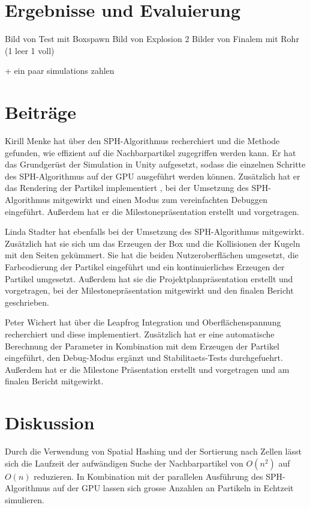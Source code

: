\documentclass[a4paper]{paper}
\begin{document}
\section{Ergebnisse und Evaluierung}
Bild von Test mit Boxspawn
Bild von Explosion
2 Bilder von Finalem mit Rohr (1 leer 1 voll)

+ ein paar simulations zahlen

\section{Beiträge}
Kirill Menke hat über den SPH-Algorithmus recherchiert und die Methode gefunden, wie 
effizient auf die Nachbarpartikel zugegriffen werden kann. Er hat das Grundgerüst der Simulation in Unity aufgesetzt, sodass die einzelnen Schritte des SPH-Algorithmus auf der GPU ausgeführt werden können. Zusätzlich hat er das Rendering der Partikel implementiert , bei der Umsetzung des SPH-Algorithmus mitgewirkt und einen Modus zum vereinfachten Debuggen eingeführt. Außerdem hat er die Milestonepräsentation erstellt und vorgetragen. 

Linda Stadter hat ebenfalls bei der Umsetzung des SPH-Algorithmus mitgewirkt. Zusätzlich hat sie sich um das Erzeugen der Box und die Kollisionen der Kugeln mit den Seiten gekümmert. Sie hat die beiden Nutzeroberflächen umgesetzt, die Farbcodierung der Partikel eingeführt und ein kontinuierliches Erzeugen der Partikel umgesetzt. Außerdem hat sie die Projektplanpräsentation erstellt und vorgetragen, bei der Milestonepräsentation mitgewirkt und den finalen Bericht geschrieben.

Peter Wichert hat über die Leapfrog Integration und Oberflächenspannung recherchiert und diese implementiert. Zusätzlich hat er eine automatische Berechnung der Parameter in Kombination mit dem Erzeugen der Partikel eingeführt, den Debug-Modus ergänzt und Stabilitaets-Tests durchgefuehrt. Außerdem hat er die Milestone Präsentation erstellt und vorgetragen und am finalen Bericht mitgewirkt.



\section{Diskussion}
Durch die Verwendung von Spatial Hashing und der Sortierung nach Zellen lässt sich die Laufzeit der aufwändigen Suche der Nachbarpartikel von $O(n^2)$ auf $O(n)$ reduzieren.
In Kombination mit der parallelen Ausführung des SPH-Algorithmus auf der GPU lassen sich grosse Anzahlen an Partikeln in Echtzeit simulieren.
\end{document}
